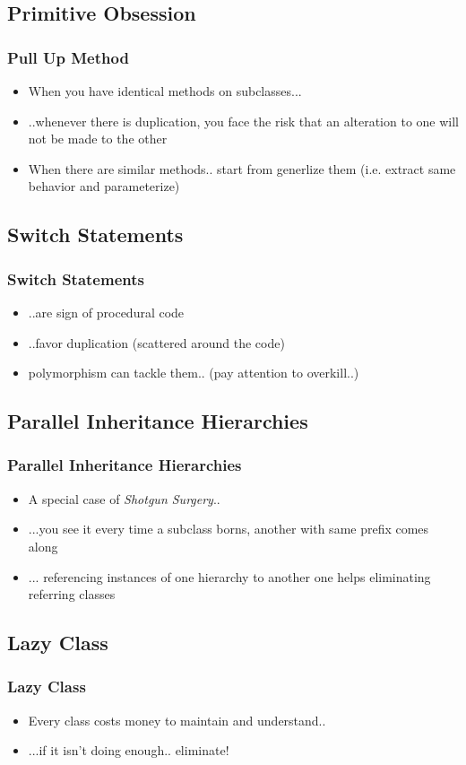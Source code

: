 \documentclass{beamer}
\begin{document}
\subsection{Primitive Obsession}
\begin{frame}
  \frametitle{Pull Up Method}
  \begin{itemize}
	\item<+-> When you have identical methods on subclasses...
	\item<+-> ..whenever there is duplication, you face the risk that an alteration to one will not be made to the other
	\item<+-> When there are similar methods.. start from generlize them (i.e. extract same behavior and parameterize)
  \end{itemize}
\end{frame}

\subsection{Switch Statements}
\begin{frame}
  \frametitle{Switch Statements}
  \begin{itemize}
	\item<+-> ..are sign of procedural code
	\item<+-> ..favor duplication (scattered around the code)
	\item<+-> polymorphism can tackle them.. (pay attention to overkill..)
  \end{itemize}
\end{frame}


\subsection{Parallel Inheritance Hierarchies}
\begin{frame}
  \frametitle{Parallel Inheritance Hierarchies}
  \begin{itemize}
	\item<+-> A special case of \textit{Shotgun Surgery}..
	\item<+-> ...you see it every time a subclass borns, another with same prefix comes along 
	\item<+-> ... referencing instances of one hierarchy to another one helps eliminating referring classes
  \end{itemize}
\end{frame}

\subsection{Lazy Class}
\begin{frame}
  \frametitle{Lazy Class}
  \begin{itemize}
	\item<+-> Every class costs money to maintain and understand..
	\item<+-> ...if it isn't doing enough.. eliminate! 
  \end{itemize}
\end{frame}
\end{document}
